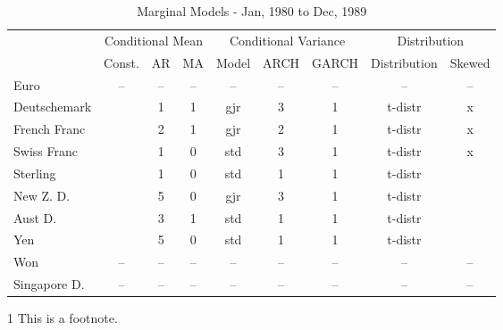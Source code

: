 \documentclass[12pt]{article}
\begin{document}
\begin{table}
	\caption{Marginal Models - Jan, 1980 to Dec, 1989}
	\begin{threeparttable}
		\begin{tabular}[l]{l c c c c c c c c}
	    \hline
	& \multicolumn{3}{c}{Conditional Mean}  & \multicolumn{3}{c}{Conditional Variance}  & \multicolumn{2}{c}{Distribution} \\
			            & Const.     & AR & MA & Model & ARCH & GARCH & Distribution & Skewed     \\
	\hline
	    Euro            & --         & -- & -- & --    & --   & --    & --           & --         \\
		Deutschemark    & \checkmark & 1  & 1  & gjr   & 3    & 1     & t-distr      & x          \\
		French Franc    & \checkmark & 2  & 1  & gjr   & 2    & 1     & t-distr      & x          \\
		Swiss Franc     & \checkmark & 1  & 0  & std   & 3    & 1     & t-distr      & x          \\
		Sterling        & \checkmark & 1  & 0  & std   & 1    & 1     & t-distr      & \checkmark \\
		New Z. D.       & \checkmark & 5  & 0  & gjr   & 3    & 1     & t-distr      & \checkmark \\
		Aust D.         & \checkmark & 3  & 1  & std   & 1    & 1     & t-distr      & \checkmark \\
		Yen             & \checkmark & 5  & 0  & std   & 1    & 1     & t-distr      & \checkmark \\
		Won             & --         & -- & -- & --    & --   & --    & --           & --         \\
		Singapore D.    & --         & -- & -- & --    & --   & --    & --           & --         \\
	\hline
		\end{tabular}
		\begin{tablenotes}
			\item[1]{\footnotesize This is a footnote.}
		\end{tablenotes}
	\end{threeparttable}
\end{table}

\newcommand{\checkplus}[0]{\checkmark +}
\end{document}
